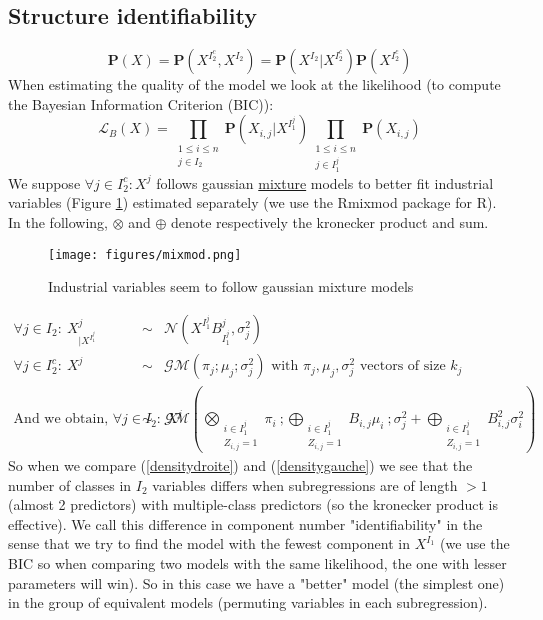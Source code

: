 \documentclass[11pt,a4paper]{article}
\begin{document}
\subsection{Structure identifiability}
	\begin{equation}
		\mathbf{P}(X)=\mathbf{P}(X^{I_2^c},X^{I_2})=\mathbf{P}(X^{I_2}|X^{I_2^c})\mathbf{P}(X^{I_2^c})\label{decompprobas}
	\end{equation}	
		When estimating the quality of the model we look at the likelihood (to compute the Bayesian Information Criterion (BIC)):
			\begin{equation}
				\mathcal{L}_B(X)=\prod_{\substack{1 \leq i \leq n \\ j \in I_2}} \mathbf{P}(X_{i,j} |X^{I_1^j})\prod_{\substack{1 \leq i \leq n \\j \in I_1^j}}\mathbf{P}(X_{i,j}) \label{likelihoodind}
			\end{equation} 
	We suppose $\forall j \in I_2^c : X^{j}$  follows gaussian \underline{mixture} models to better fit industrial variables (Figure \ref{figmixture}) estimated separately (we use the Rmixmod package for R). In the following, $\otimes$ and $\oplus$ denote respectively the kronecker product and sum.
	\begin{figure}
	\begin{center}				
				\texttt{[image: figures/mixmod.png]} 
				\caption{Industrial variables seem to follow gaussian mixture models}\label{figmixture}
	\end{center}
	\end{figure}
	
	
		\begin{eqnarray}
			\forall j \in I_2 : \  X^j_{|X^{I_1^j}}&\sim & \mathcal{N}(X^{I_1^j}B_{I_1^j}^j,\sigma^2_j) \label{densitycondgauche}\\
			\forall j \in I_2^c : \  X^j &\sim & \mathcal{GM}(\pi_j;\mu_j;\sigma^2_j) \textrm{ with } \pi_j,\mu_j,\sigma^2_j \textrm{ vectors of size } k_j \label{densitydroite}\\
			\textrm{And we obtain, } \forall j \in I_2 : \  X^j&\sim & \mathcal{GM}(\bigotimes_{\substack{i \in I_1^j \\ Z_{i,j}=1 }}\pi_i \ ; 
			                                                         \bigoplus_{\substack{i \in I_1^j \\ Z_{i,j}=1 }} B_{i,j} \mu_i \ ; 
			                                                          \sigma_j^2+\bigoplus_{\substack{i \in I_1^j \\ Z_{i,j}=1 }}B_{i,j}^2 \sigma_i^2 )\label{densitygauche}
		\end{eqnarray}
		So when we compare (\ref{densitydroite}) and (\ref{densitygauche}) we see that the number of classes in $I_2$ variables differs when subregressions are of length $>1$ (almost 2 predictors) with multiple-class predictors (so the kronecker product is effective). We call this difference in component number "identifiability" in the sense that we try to find the model with the fewest component in $X^{I_1}$ (we use the BIC so when comparing two models with the same likelihood, the one with lesser parameters will win). So in this case we have a "better" model (the simplest one) in the group of equivalent models (permuting variables in each subregression).
		
\end{document}
